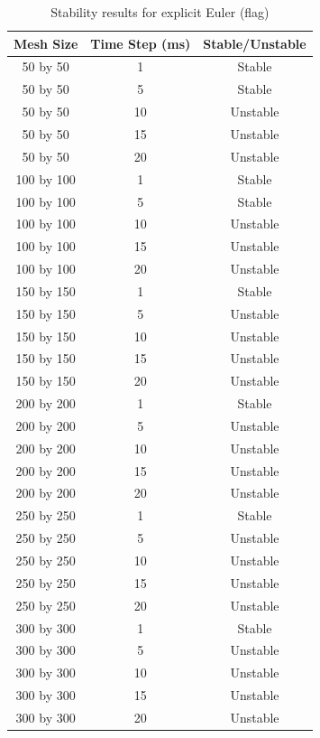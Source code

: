 \begin{table}[tp]
   \begin{minipage}{\textwidth}
      \begin{center}
         \begin{tabular}{|c|c|c|} \hline
           Mesh Size & Time Step (ms) & Stable/Unstable\\
           \hline
           50 by 50 & 1 & Stable\\ \hline
           50 by 50 & 5 & Stable\\ \hline
           50 by 50 & 10 & Unstable\\ \hline
           50 by 50 & 15 & Unstable\\ \hline
           50 by 50 & 20 & Unstable\\ \hline
           100 by 100 & 1 & Stable\\ \hline
           100 by 100 & 5 & Stable\\ \hline
           100 by 100 & 10 & Unstable\\ \hline
           100 by 100 & 15 & Unstable\\ \hline
           100 by 100 & 20 & Unstable\\ \hline           
           150 by 150 & 1 & Stable\\ \hline
           150 by 150 & 5 & Unstable\\ \hline
           150 by 150 & 10 & Unstable\\ \hline
           150 by 150 & 15 & Unstable\\ \hline
           150 by 150 & 20 & Unstable\\ \hline           
           200 by 200 & 1 & Stable\\ \hline
           200 by 200 & 5 & Unstable\\ \hline
           200 by 200 & 10 & Unstable\\ \hline
           200 by 200 & 15 & Unstable\\ \hline
           200 by 200 & 20 & Unstable\\ \hline           
           250 by 250 & 1 & Stable\\ \hline
           250 by 250 & 5 & Unstable\\ \hline
           250 by 250 & 10 & Unstable\\ \hline
           250 by 250 & 15 & Unstable\\ \hline
           250 by 250 & 20 & Unstable\\ \hline           
           300 by 300 & 1 & Stable\\ \hline
           300 by 300 & 5 & Unstable\\ \hline
           300 by 300 & 10 & Unstable\\ \hline
           300 by 300 & 15 & Unstable\\ \hline
           300 by 300 & 20 & Unstable\\ \hline
         \end{tabular}
      \end{center}
   \end{minipage}
   \caption{Stability results for explicit Euler (flag)}
   \label{tab:ee stability flag}
\end{table}

